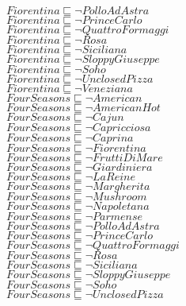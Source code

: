 \documentclass[a4paper,10pt]{article}
\begin{document}
 $Fiorentina \sqsubseteq  \lnot PolloAdAstra$\\ 
 $Fiorentina \sqsubseteq  \lnot PrinceCarlo$\\ 
 $Fiorentina \sqsubseteq  \lnot QuattroFormaggi$\\ 
 $Fiorentina \sqsubseteq  \lnot Rosa$\\ 
 $Fiorentina \sqsubseteq  \lnot Siciliana$\\ 
 $Fiorentina \sqsubseteq  \lnot SloppyGiuseppe$\\ 
 $Fiorentina \sqsubseteq  \lnot Soho$\\ 
 $Fiorentina \sqsubseteq  \lnot UnclosedPizza$\\ 
 $Fiorentina \sqsubseteq  \lnot Veneziana$\\ 
 $FourSeasons \sqsubseteq  \lnot American$\\ 
 $FourSeasons \sqsubseteq  \lnot AmericanHot$\\ 
 $FourSeasons \sqsubseteq  \lnot Cajun$\\ 
 $FourSeasons \sqsubseteq  \lnot Capricciosa$\\ 
 $FourSeasons \sqsubseteq  \lnot Caprina$\\ 
 $FourSeasons \sqsubseteq  \lnot Fiorentina$\\ 
 $FourSeasons \sqsubseteq  \lnot FruttiDiMare$\\ 
 $FourSeasons \sqsubseteq  \lnot Giardiniera$\\ 
 $FourSeasons \sqsubseteq  \lnot LaReine$\\ 
 $FourSeasons \sqsubseteq  \lnot Margherita$\\ 
 $FourSeasons \sqsubseteq  \lnot Mushroom$\\ 
 $FourSeasons \sqsubseteq  \lnot Napoletana$\\ 
 $FourSeasons \sqsubseteq  \lnot Parmense$\\ 
 $FourSeasons \sqsubseteq  \lnot PolloAdAstra$\\ 
 $FourSeasons \sqsubseteq  \lnot PrinceCarlo$\\ 
 $FourSeasons \sqsubseteq  \lnot QuattroFormaggi$\\ 
 $FourSeasons \sqsubseteq  \lnot Rosa$\\ 
 $FourSeasons \sqsubseteq  \lnot Siciliana$\\ 
 $FourSeasons \sqsubseteq  \lnot SloppyGiuseppe$\\ 
 $FourSeasons \sqsubseteq  \lnot Soho$\\ 
 $FourSeasons \sqsubseteq  \lnot UnclosedPizza$\\ 
\end{document}
